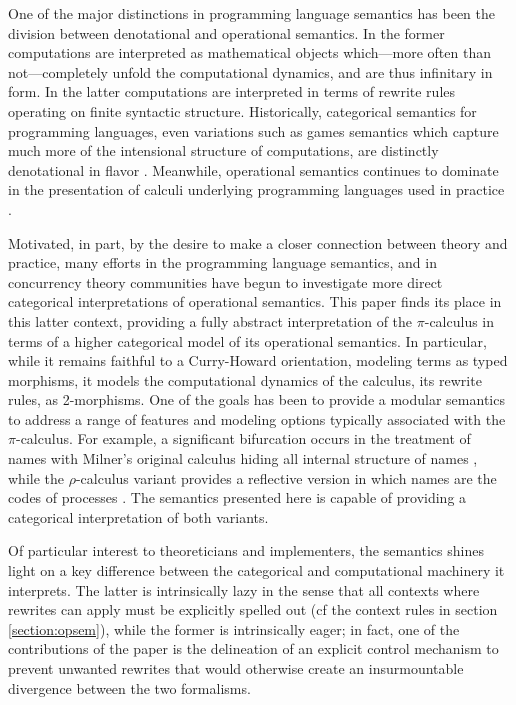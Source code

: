 \documentclass[]{acm_proc_article-sp}
\numberwithin{equation}{subsection}
\newcommand{\pic}{$\pi$-calculus}
\begin{document}
One of the major distinctions in programming language semantics has
been the division between denotational and operational semantics. In
the former computations are interpreted as mathematical objects
which---more often than not---completely unfold the computational
dynamics, and are thus infinitary in form. In the latter computations
are interpreted in terms of rewrite rules operating on finite
syntactic structure. Historically, categorical semantics for
programming languages, even variations such as games semantics
\cite{DBLP:conf/lics/McCusker96} which capture much more of the
intensional structure of computations, are distinctly denotational in
flavor \cite{DBLP:journals/iandc/Moggi91}. Meanwhile, operational
semantics continues to dominate in the presentation of calculi
underlying programming languages used in practice
\cite{DBLP:conf/aplas/MaffeisMT08}
\cite{DBLP:conf/oopsla/IgarashiPW99}
\cite{Politz:2013:PFM:2509136.2509536}.

Motivated, in part, by the desire to make a closer connection between
theory and practice, many efforts in the programming language
semantics, and in concurrency theory communities have begun to
investigate more direct categorical interpretations of operational
semantics. This paper finds its place in this latter context,
providing a fully abstract interpretation of the {\pic} in terms of a
higher categorical model of its operational semantics. In particular,
while it remains faithful to a Curry-Howard orientation, modeling
terms as typed morphisms, it models the computational dynamics of the
calculus, its rewrite rules, as 2-morphisms. One of the goals has been
to provide a modular semantics to address a range of features and
modeling options typically associated with the {\pic}. For example, a
significant bifurcation occurs in the treatment of names with Milner's
original calculus hiding all internal structure of names
\cite{milner91polyadicpi}, while the $\rho$-calculus variant provides
a reflective version in which names are the codes of processes
\cite{DBLP:journals/entcs/MeredithR05}. The semantics presented here
is capable of providing a categorical interpretation of both variants.

Of particular interest to theoreticians and implementers, the
semantics shines light on a key difference between the categorical and
computational machinery it interprets. The latter is intrinsically
lazy in the sense that all contexts where rewrites can apply must be
explicitly spelled out (cf the context rules in section
\ref{section:opsem}), while the former is intrinsically eager; in
fact, one of the contributions of the paper is the delineation of an
explicit control mechanism to prevent unwanted rewrites that would
otherwise create an insurmountable divergence between the two
formalisms. 
\end{document}
